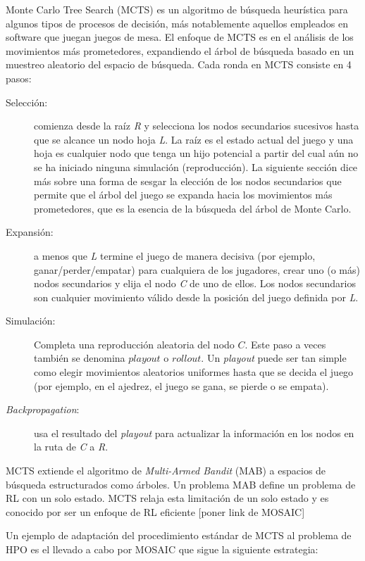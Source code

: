Monte Carlo Tree Search (MCTS) es un algoritmo de búsqueda heurística para algunos tipos de procesos de decisión, más notablemente aquellos empleados en software que juegan juegos de mesa. El enfoque de MCTS es en el análisis de los movimientos más prometedores, expandiendo el árbol de búsqueda basado en un muestreo aleatorio del espacio de búsqueda. Cada ronda en MCTS consiste en 4 pasos:
\begin{description}
	\item[Selección:] comienza desde la raíz \textit{R} y selecciona los nodos secundarios sucesivos hasta que se alcance un nodo hoja \textit{L}. La raíz es el estado actual del juego y una hoja es cualquier nodo que tenga un hijo potencial a partir del cual aún no se ha iniciado ninguna simulación (reproducción). La siguiente sección dice más sobre una forma de sesgar la elección de los nodos secundarios que permite que el árbol del juego se expanda hacia los movimientos más prometedores, que es la esencia de la búsqueda del árbol de Monte Carlo.
	\item[Expansión:] a menos que \textit{L} termine el juego de manera decisiva (por ejemplo, ganar/perder/empatar) para cualquiera de los jugadores, crear uno (o más) nodos secundarios y elija el nodo \textit{C} de uno de ellos. Los nodos secundarios son cualquier movimiento válido desde la posición del juego definida por \textit{L}.
	\item[Simulación:] Completa una reproducción aleatoria del nodo $C$. Este paso a veces también se denomina $playout$ o $rollout$. Un \textit{playout} puede ser tan simple como elegir movimientos aleatorios uniformes hasta que se decida el juego (por ejemplo, en el ajedrez, el juego se gana, se pierde o se empata).
	\item[\textit{Backpropagation}:] usa el resultado del \textit{playout} para actualizar la información en los nodos en la ruta de \textit{C} a \textit{R}. 
\end{description}

MCTS extiende el algoritmo de \textit{Multi-Armed Bandit} (MAB) a espacios de búsqueda estructurados como árboles. Un problema MAB define un problema de RL con un solo estado. MCTS relaja esta limitación de un solo estado y es conocido por ser un enfoque de RL eficiente [poner link de MOSAIC]

Un ejemplo de adaptación del procedimiento estándar de MCTS al problema de HPO es el llevado a cabo por MOSAIC que sigue la siguiente estrategia:

